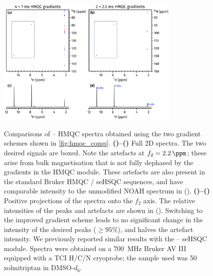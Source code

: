 \documentclass[a4paper,11pt]{article}
\newcommand{\proton}{\ch{^{1}H}}
\newcommand{\nitrogen}{\ch{^{15}N}}
\newcommand{\HN}{\proton{}--\nitrogen{}}
\newcommand*{\zolmi}{Spectra were obtained on a \SI{700}{\MHz} Bruker AV III equipped with a TCI H/C/N cryoprobe; the sample used was \SI{50}{\milli\molar} zolmitriptan in DMSO-\(d_6\).}
\begin{document}
\begin{refsection}
\begin{figure}[H]
    \centering
    \includegraphics[width=0.8\textwidth]{hmqc_comp_snr.png}
    {\label{fig:hmqc_comp_snr_bad2d}}
    {\label{fig:hmqc_comp_snr_good2d}}
    {\label{fig:hmqc_comp_snr_bad1d}}
    {\label{fig:hmqc_comp_snr_good1d}}
    \caption{
        Comparisons of \HN{} HMQC spectra obtained using the two gradient schemes shown in \cref{fig:hmqc_comp}.
        \textbf{()--()} Full 2D spectra.
        The two desired signals are boxed.
        Note the artefacts at \(f_2 = \SI{2.2}{\ppm}\); these arise from bulk magnetisation that is not fully dephased by the gradients in the HMQC module.\autocite{Yong2021JMR}
        These artefacts are also present in the standard Bruker HMQC / seHSQC sequences, and have comparable intensity to the unmodified NOAH spectrum in (\textbf{}).
        \textbf{()--()} Positive projections of the spectra onto the \(f_2\) axis.
        The relative intensities of the peaks and artefacts are shown in ().
        Switching to the improved gradient scheme leads to no significant change in the intensity of the desired peaks (\(\geq 95\%\)), and halves the artefact intensity.
        We previously reported similar results with the \HN{} seHSQC module.\autocite{Yong2021JMR}
        \zolmi{}
    }
    \label{fig:hmqc_comp_snr}
\end{figure}

\printbibliography{}
\clearpage    %

\end{refsection}
\end{document}
